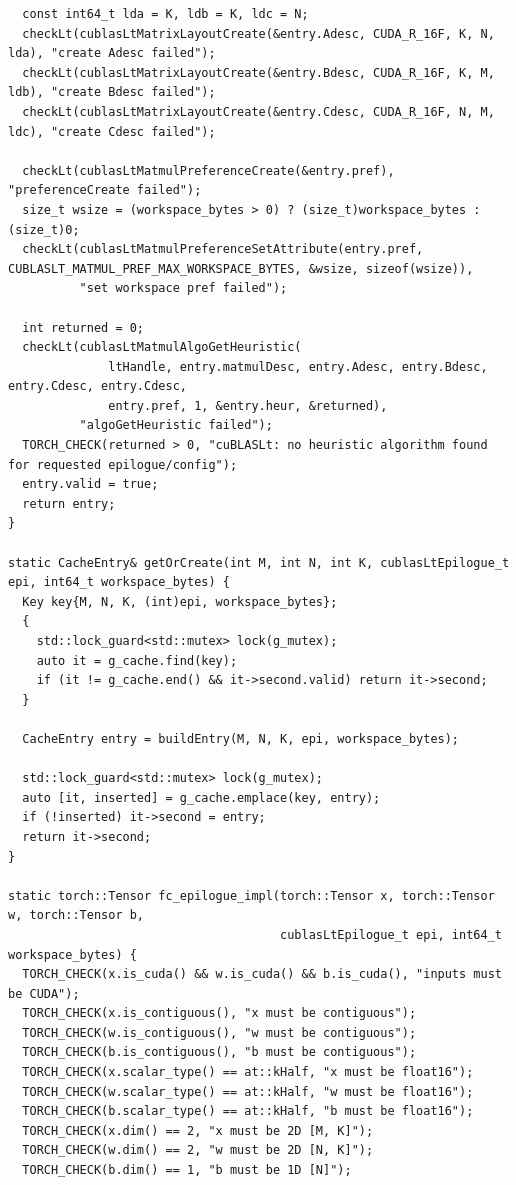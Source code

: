 \begin{tcolorbox}[mybox, title={our model in Level 3 Task 44 — Reported 3.75 $\times$ Speedup}]
\begin{verbatim}
  const int64_t lda = K, ldb = K, ldc = N;
  checkLt(cublasLtMatrixLayoutCreate(&entry.Adesc, CUDA_R_16F, K, N, lda), "create Adesc failed");
  checkLt(cublasLtMatrixLayoutCreate(&entry.Bdesc, CUDA_R_16F, K, M, ldb), "create Bdesc failed");
  checkLt(cublasLtMatrixLayoutCreate(&entry.Cdesc, CUDA_R_16F, N, M, ldc), "create Cdesc failed");

  checkLt(cublasLtMatmulPreferenceCreate(&entry.pref), "preferenceCreate failed");
  size_t wsize = (workspace_bytes > 0) ? (size_t)workspace_bytes : (size_t)0;
  checkLt(cublasLtMatmulPreferenceSetAttribute(entry.pref, CUBLASLT_MATMUL_PREF_MAX_WORKSPACE_BYTES, &wsize, sizeof(wsize)),
          "set workspace pref failed");

  int returned = 0;
  checkLt(cublasLtMatmulAlgoGetHeuristic(
              ltHandle, entry.matmulDesc, entry.Adesc, entry.Bdesc, entry.Cdesc, entry.Cdesc,
              entry.pref, 1, &entry.heur, &returned),
          "algoGetHeuristic failed");
  TORCH_CHECK(returned > 0, "cuBLASLt: no heuristic algorithm found for requested epilogue/config");
  entry.valid = true;
  return entry;
}

static CacheEntry& getOrCreate(int M, int N, int K, cublasLtEpilogue_t epi, int64_t workspace_bytes) {
  Key key{M, N, K, (int)epi, workspace_bytes};
  {
    std::lock_guard<std::mutex> lock(g_mutex);
    auto it = g_cache.find(key);
    if (it != g_cache.end() && it->second.valid) return it->second;
  }

  CacheEntry entry = buildEntry(M, N, K, epi, workspace_bytes);

  std::lock_guard<std::mutex> lock(g_mutex);
  auto [it, inserted] = g_cache.emplace(key, entry);
  if (!inserted) it->second = entry;
  return it->second;
}

static torch::Tensor fc_epilogue_impl(torch::Tensor x, torch::Tensor w, torch::Tensor b,
                                      cublasLtEpilogue_t epi, int64_t workspace_bytes) {
  TORCH_CHECK(x.is_cuda() && w.is_cuda() && b.is_cuda(), "inputs must be CUDA");
  TORCH_CHECK(x.is_contiguous(), "x must be contiguous");
  TORCH_CHECK(w.is_contiguous(), "w must be contiguous");
  TORCH_CHECK(b.is_contiguous(), "b must be contiguous");
  TORCH_CHECK(x.scalar_type() == at::kHalf, "x must be float16");
  TORCH_CHECK(w.scalar_type() == at::kHalf, "w must be float16");
  TORCH_CHECK(b.scalar_type() == at::kHalf, "b must be float16");
  TORCH_CHECK(x.dim() == 2, "x must be 2D [M, K]");
  TORCH_CHECK(w.dim() == 2, "w must be 2D [N, K]");
  TORCH_CHECK(b.dim() == 1, "b must be 1D [N]");


\end{verbatim}
\end{tcolorbox}
